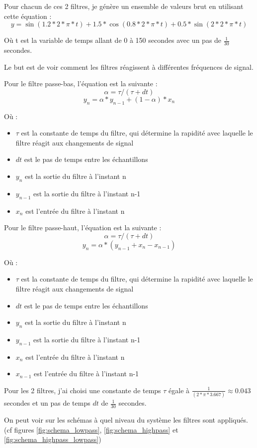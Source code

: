 \documentclass{article}
\begin{document}
Pour chacun de ces 2 filtres, je génère un ensemble de valeurs brut en utilisant cette équation :
$$y = \sin(1.2 * 2 * \pi * t) + 1.5 * \cos(0.8 * 2 * \pi * t) + 0.5 * \sin(2 * 2 * \pi * t)$$

Où t est la variable de temps allant de 0 à 150 secondes avec un pas de $\frac{1}{30}$ secondes.

Le but est de voir comment les filtres réagissent à différentes fréquences de signal.

Pour le filtre passe-bas, l'équation est la suivante :
$$\alpha = \tau / (\tau + dt)$$
$$y_n = \alpha * y_{n-1} + (1 - \alpha) * x_n$$

Où :
\begin{itemize}
    \item $\tau$ est la constante de temps du filtre, qui détermine la rapidité avec laquelle le filtre réagit aux changements de signal
    \item $dt$ est le pas de temps entre les échantillons
    \item $y_n$ est la sortie du filtre à l'instant n
    \item $y_{n-1}$ est la sortie du filtre à l'instant n-1
    \item $x_n$ est l'entrée du filtre à l'instant n
\end{itemize}

Pour le filtre passe-haut, l'équation est la suivante :
$$\alpha = \tau / (\tau + dt)$$
$$y_n = \alpha * (y_{n-1} + x_n - x_{n-1})$$

Où :
\begin{itemize}
    \item $\tau$ est la constante de temps du filtre, qui détermine la rapidité avec laquelle le filtre réagit aux changements de signal
    \item $dt$ est le pas de temps entre les échantillons
    \item $y_n$ est la sortie du filtre à l'instant n
    \item $y_{n-1}$ est la sortie du filtre à l'instant n-1
    \item $x_n$ est l'entrée du filtre à l'instant n
    \item $x_{n-1}$ est l'entrée du filtre à l'instant n-1
\end{itemize}

Pour les 2 filtres, j'ai choisi une constante de temps $\tau$ égale à $\frac{1}{(2 * \pi * 3.667)} \approx 0.043$ secondes et un pas de temps $dt$ de $\frac{1}{30}$ secondes.

On peut voir sur les schémas à quel niveau du système les filtres sont appliqués. (cf figures \ref{fig:schema_lowpass}, \ref{fig:schema_highpass} et \ref{fig:schema_highpass_lowpass})
\end{document}
